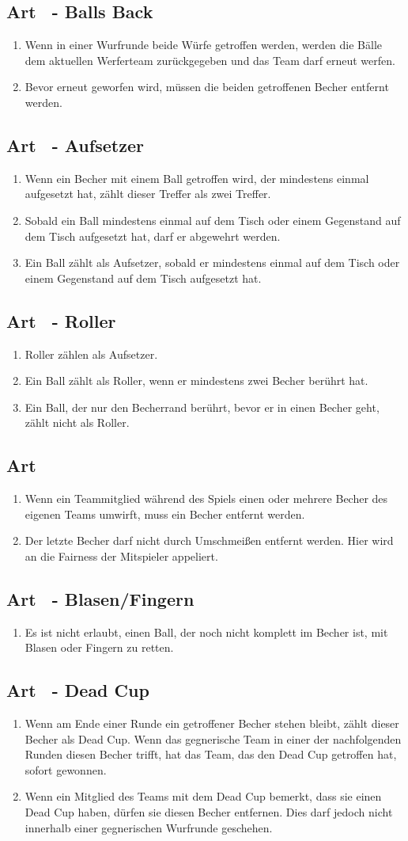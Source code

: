 \documentclass[a4paper,11pt]{scrartcl}
\newcommand{\enum}[1]{\begin{enumerate}[label=(\arabic*)]#1\end{enumerate}}
\newcommand{\art}[2]{\subsection*{#1} \enum{#2}}
\newcommand{\quot}[1]{\glqq #1\grqq}
\newcounter{art}
\begin{document}
    \art{Art \theart\ - \quot{Balls Back}}{
        \item
            Wenn in einer Wurfrunde beide Würfe getroffen werden, werden die Bälle dem aktuellen Werferteam zurückgegeben und das Team darf erneut werfen.
        \item
            Bevor erneut geworfen wird, müssen die beiden getroffenen Becher entfernt werden.
    }

    \art{Art \theart\ - Aufsetzer}{
        \item
            Wenn ein Becher mit einem Ball getroffen wird, der mindestens einmal aufgesetzt hat, zählt dieser Treffer als zwei Treffer.
        \item
            Sobald ein Ball mindestens einmal auf dem Tisch oder einem Gegenstand auf dem Tisch aufgesetzt hat, darf er abgewehrt werden.
        \item
            Ein Ball zählt als Aufsetzer, sobald er mindestens einmal auf dem Tisch oder einem Gegenstand auf dem Tisch aufgesetzt hat.
    }

    \art{Art \theart\ - Roller}{
        \item
            Roller zählen als Aufsetzer.
        \item
            Ein Ball zählt als Roller, wenn er mindestens zwei Becher berührt hat.
        \item
            Ein Ball, der nur den Becherrand berührt, bevor er in einen Becher geht, zählt nicht als Roller.
    }

    \art{Art \theart}{
        \item
            Wenn ein Teammitglied während des Spiels einen oder mehrere Becher des eigenen Teams umwirft, muss ein Becher entfernt werden.
        \item
            Der letzte Becher darf nicht durch Umschmeißen entfernt werden. Hier wird an die Fairness der Mitspieler appeliert.
    }

    \art{Art \theart\ - \quot{Blasen/Fingern}}{
        \item
            Es ist nicht erlaubt, einen Ball, der noch nicht komplett im Becher ist, mit \quot{Blasen} oder \quot{Fingern} zu retten.
    }

    \art{Art \theart\ - \quot{Dead Cup}}{
        \item
            Wenn am Ende einer Runde ein getroffener Becher stehen bleibt, zählt dieser Becher als \quot{Dead Cup}. Wenn das gegnerische Team in einer der nachfolgenden Runden diesen Becher trifft, hat das Team, das den \quot{Dead Cup} getroffen hat, sofort gewonnen.
        \item
            Wenn ein Mitglied des Teams mit dem \quot{Dead Cup} bemerkt, dass sie einen \quot{Dead Cup} haben, dürfen sie diesen Becher entfernen. Dies darf jedoch nicht innerhalb einer gegnerischen Wurfrunde geschehen.
    }
\end{document}

